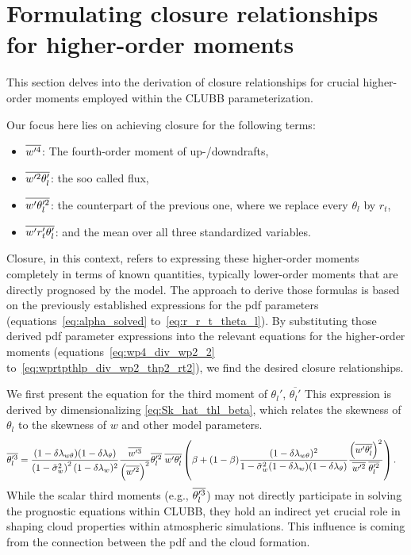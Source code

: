 \section{Formulating closure relationships for higher-order moments}
\label{sec:prop_closure}

This section delves into the derivation of closure relationships for crucial higher-order moments
employed within the \gls{CLUBB} parameterization.

Our focus here lies on achieving closure for the following terms:
\begin{itemize}
    \item $\overline{w'^4}$: The fourth-order moment of up-/downdrafts,
    \item $\overline{w'^2 \theta_l'}$: the soo called flux,
    \item $\overline{w' \theta_l'^2}$: the counterpart of the previous one, where we replace every $\theta_l$ by $r_t$,
    \item $\overline{w' r_t' \theta_l'}$: and the mean over all three standardized variables.
\end{itemize}
Closure, in this context,
refers to expressing these higher-order moments completely in terms of known quantities,
typically lower-order moments that are directly prognosed by the model.
The approach to derive those formulas is based on
the previously established expressions for the \gls{pdf} parameters (equations~\eqref{eq:alpha_solved} to~\eqref{eq:r_r_t_theta_l}).
By substituting those derived \gls{pdf} parameter expressions
into the relevant equations for the higher-order moments (equations~\eqref{eq:wp4_div_wp2_2} to~\eqref{eq:wprtpthlp_div_wp2_thp2_rt2}),
we find the desired closure relationships.

We first present the equation for the third moment of $\theta_l'$, $\overline{\theta_l'}$
This expression is derived by dimensionalizing \cref{eq:Sk_hat_thl_beta},
which relates the skewness of $\theta_l$ to the skewness of $w$ and other model parameters.
\begin{align}
    \label{eq:thlp3_beta}
    \overline{\theta_l'^3}
    &= \frac{(1-\delta \lambda_{w \theta})(1-\delta \lambda_\theta)}{\left( 1 - \tilde{\sigma}_w^2 \right)^2 (1-\delta \lambda_w)^2}
    \frac{\overline{w'^3}}{\left( \overline{w'^2} \right)^2}
    \overline{\theta_l'^2} \;
    \overline{w'\theta_l'}
    \left(\beta + (1-\beta)
    \frac{(1-\delta \lambda_{w \theta})^2}{1-\tilde{\sigma}_w^2 (1-\delta \lambda_w)(1-\delta \lambda_\theta)}
    \frac{\left(\overline{w'\theta_l'}\right)^2}{\overline{w'^2} \; \overline{\theta_l'^2}}\right).
\end{align}
While the scalar third moments (e.g., $\overline{\theta_l'^3}$) may not directly participate
in solving the prognostic equations within \gls{CLUBB},
they hold an indirect yet crucial role in shaping cloud properties within atmospheric simulations.
This influence is coming from the connection between the \gls{pdf} and the cloud formation.

